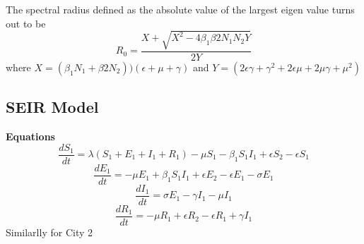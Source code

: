 \documentclass{article}
\begin{document}
The spectral radius defined as the absolute value of the largest eigen value turns out to be
$$R_{0}=\frac{X+\sqrt{X^{2}-4\beta_{1}\beta{2}N_{1}N_{2}Y}}{2Y}$$ where $X=(\beta_{1} N_{1}+\beta{2} N_{2}))(\epsilon+\mu+\gamma)$ and $Y=(2 \epsilon \gamma+\gamma^{2}+2 \epsilon \mu+ 2 \mu \gamma+ \mu^{2})$

\subsection{SEIR Model}
\textbf{Equations} \newline
$$\frac{dS_{1}}{dt}=\lambda(S_{1}+E_{1}+I_{1}+R_{1}) -\mu  S_{1} - \beta_{1} S_{1}I_{1}  + \epsilon S_{2} -\epsilon S_{1} $$
$$\frac{dE_{1}}{dt}= -\mu  E_{1} + \beta_{1} S_{1}I_{1}  + \epsilon E_{2} -\epsilon E_{1} -\sigma  E_{1} $$
$$\frac{dI_{1}}{dt}= \sigma E_{1} -\gamma I_{1} -\mu I_{1}$$
$$\frac{dR_{1}}{dt}= -\mu  R_{1} +  \epsilon R_{2} -\epsilon R_{1} +\gamma I_{1} $$
Similarlly for City 2
\end{document}
